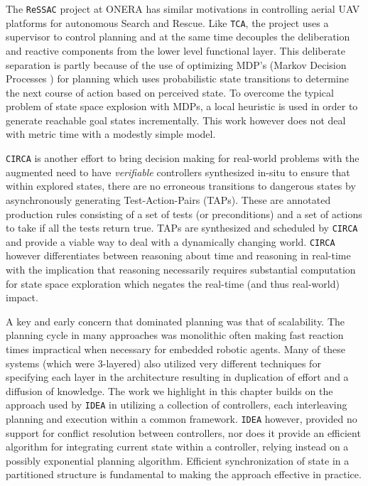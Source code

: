 The \texttt{ReSSAC} project at ONERA \cite{teichteil07} has similar
motivations in controlling aerial UAV platforms for autonomous Search
and Rescue. Like \texttt{TCA}, the project uses a supervisor to
control planning and at the same time decouples the deliberation and
reactive components from the lower level functional layer. This
deliberate separation is partly because of the use of optimizing MDP’s
(Markov Decision Processes \cite{mdp93}) for planning which uses
probabilistic state transitions to determine the next course of action
based on perceived state. To overcome the typical problem of state
space explosion with MDPs, a local heuristic is used in order to
generate reachable goal states incrementally. This work however does
not deal with metric time with a modestly simple model.

\texttt{CIRCA} \cite{musliner95} is another effort to bring decision
making for real-world problems with the augmented need to have
\emph{verifiable} controllers synthesized in-situ to ensure that
within explored states, there are no erroneous transitions to
dangerous states by asynchronously generating Test-Action-Pairs
(TAPs).  These are annotated production rules consisting of a set of
tests (or preconditions) and a set of actions to take if all the tests
return true. TAPs are synthesized and scheduled by \texttt{CIRCA} and
provide a viable way to deal with a dynamically changing
world. \texttt{CIRCA} however differentiates between reasoning about
time and reasoning in real-time with the implication that reasoning
necessarily requires substantial computation for state space
exploration which negates the real-time (and thus real-world)
impact. 

A key and early concern that dominated planning was that of
scalability.  The planning cycle in many approaches was monolithic
often making fast reaction times impractical when necessary for
embedded robotic agents. Many of these systems (which were
$3$-layered) also utilized very different techniques for specifying
each layer in the architecture resulting in duplication of effort and
a diffusion of knowledge.  The work we highlight in this chapter
builds on the approach used by \texttt{IDEA} \cite{mus02, mus04} in
utilizing a collection of controllers, each interleaving planning and
execution within a common framework. \texttt{IDEA} however, provided
no support for conflict resolution between controllers, nor does it
provide an efficient algorithm for integrating current state within a
controller, relying instead on a possibly exponential planning
algorithm. Efficient synchronization of state in a partitioned
structure is fundamental to making the approach effective in practice.

